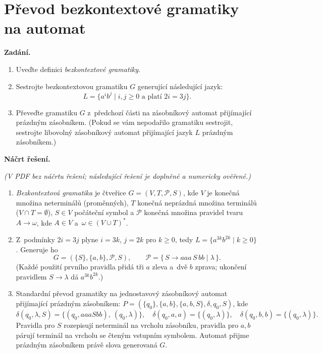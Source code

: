 \section{Převod bezkontextové gramatiky na automat}

\noindent\textbf{Zadání.}\par
\begin{enumerate}
\item Uveďte definici \textit{bezkontextové gramatiky}.
\item Sestrojte bezkontextovou gramatiku $G$ generující následující jazyk:
  \[ L = \{a^i b^j \mid i, j \geq 0 \text{ a~platí } 2i = 3j\}. \]
\item Převeďte gramatiku $G$ z~předchozí části na zásobníkový automat přijímající
  prázdným zásobníkem. (Pokud se vám nepodařilo gramatiku sestrojit, sestrojte
  libovolný zásobníkový automat přijímající jazyk $L$ prázdným zásobníkem.)
\end{enumerate}

\medskip
\noindent\textbf{Náčrt řešení.}\par
\textit{(V PDF bez náčrtu řešení; následující řešení je doplněné a numericky ověřené.)}
\begin{enumerate}
\item \textit{Bezkontextová gramatika} je čtveřice $G = (V, T, \mathcal{P}, S)$, kde $V$ je
  konečná množina neterminálů (proměnných), $T$ konečná neprázdná množina terminálů
  ($V \cap T = \emptyset$), $S \in V$ počáteční symbol a $\mathcal{P}$ konečná množina
  pravidel tvaru $A \to \omega$, kde $A \in V$ a~$\omega \in (V \cup T)^*$.

\item Z~podmínky $2i = 3j$ plyne $i = 3k$, $j = 2k$ pro $k \geq 0$, tedy
  $L = \{a^{3k} b^{2k} \mid k \geq 0\}$. Generuje ho
  \[ G = (\{S\}, \{a, b\}, \mathcal{P}, S), \qquad \mathcal{P} = \{\, S \to aaa\,S\,bb \mid \lambda \,\}. \]
  (Každé použití prvního pravidla přidá tři $a$ zleva a~dvě $b$ zprava; ukončení pravidlem
  $S \to \lambda$ dá $a^{3k} b^{2k}$.)

\item Standardní převod gramatiky na jednostavový zásobníkový automat přijímající
  prázdným zásobníkem: $P = (\{q_0\}, \{a, b\}, \{a, b, S\}, \delta, q_0, S)$, kde
  \[ \delta(q_0, \lambda, S) = \{(q_0, aaaSbb),\ (q_0, \lambda)\}, \quad
     \delta(q_0, a, a) = \{(q_0, \lambda)\}, \quad
     \delta(q_0, b, b) = \{(q_0, \lambda)\}. \]
  Pravidla pro $S$ rozepisují neterminál na vrcholu zásobníku, pravidla pro $a, b$ párují
  terminál na vrcholu se čteným vstupním symbolem. Automat přijme prázdným zásobníkem
  právě slova generovaná $G$.
\end{enumerate}
